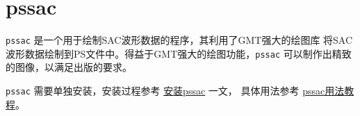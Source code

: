 \section{pssac}
\label{sec:pssac}

\texttt{pssac} 是一个用于绘制SAC波形数据的程序，其利用了GMT强大的绘图库
将SAC波形数据绘制到PS文件中。得益于GMT强大的绘图功能，\texttt{pssac}
可以制作出精致的图像，以满足出版的要求。

\texttt{pssac} 需要单独安装，安装过程参考
\href{http://seisman.info/install-pssac.html}{安装pssac} 一文，
具体用法参考 \href{http://seisman.info/pssac-notes.html}{pssac用法教程}。
